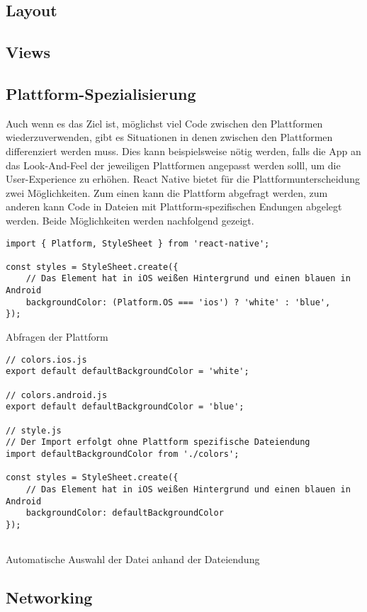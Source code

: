 \subsection{Layout}

\subsection{Views}

\subsection{Plattform-Spezialisierung}
Auch wenn es das Ziel ist, möglichst viel Code zwischen den Plattformen wiederzuverwenden, gibt es Situationen in denen zwischen den Plattformen differenziert werden muss. Dies kann beispielsweise nötig werden, falls die App an das Look-And-Feel der jeweiligen Plattformen angepasst werden solll, um die User-Experience zu erhöhen.
React Native bietet für die Plattformunterscheidung zwei Möglichkeiten. Zum einen kann die Plattform abgefragt werden, zum anderen kann Code in Dateien mit Plattform-spezifischen Endungen abgelegt werden. Beide Möglichkeiten werden nachfolgend gezeigt.

\begin{listing}[H]
    \begin{verbatim}
import { Platform, StyleSheet } from 'react-native';

const styles = StyleSheet.create({
    // Das Element hat in iOS weißen Hintergrund und einen blauen in Android
    backgroundColor: (Platform.OS === 'ios') ? 'white' : 'blue',
});
    \end{verbatim}
    \caption{Abfragen der Plattform}
    \label{lst:platform_os}
\end{listing}

\begin{listing}[H]
    \begin{verbatim}
// colors.ios.js
export default defaultBackgroundColor = 'white';

// colors.android.js
export default defaultBackgroundColor = 'blue';
 
// style.js
// Der Import erfolgt ohne Plattform spezifische Dateiendung
import defaultBackgroundColor from './colors';
 
const styles = StyleSheet.create({
    // Das Element hat in iOS weißen Hintergrund und einen blauen in Android
    backgroundColor: defaultBackgroundColor
});
     
    \end{verbatim}
    \caption{Automatische Auswahl der Datei anhand der Dateiendung}
    \label{lst:platform_file}
\end{listing}

\subsection{Networking}
